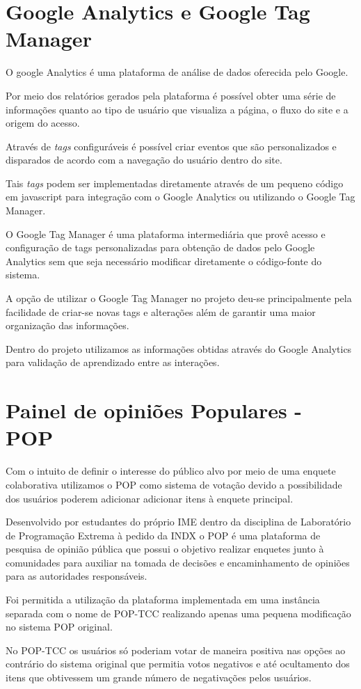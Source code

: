 \section{Google Analytics e Google Tag Manager}
\par O google Analytics é uma plataforma de análise de dados oferecida pelo Google.
\par Por meio dos relatórios gerados pela plataforma é possível obter uma série de informações quanto ao tipo de usuário que visualiza a página, o fluxo do site e a origem do acesso.
\par Através de \emph{tags} configuráveis é possível criar eventos que são personalizados e disparados de acordo com a navegação do usuário dentro do site.
\par Tais \emph{tags} podem ser implementadas diretamente através de um pequeno código em javascript para integração com o Google Analytics ou utilizando o Google Tag Manager.
\par O Google Tag Manager é uma plataforma intermediária que provê acesso e configuração de tags personalizadas para obtenção de dados pelo Google Analytics sem que seja necessário modificar diretamente o código-fonte do sistema.
\par A opção de utilizar o Google Tag Manager no projeto deu-se principalmente pela facilidade de criar-se novas tags e alterações além de garantir uma maior organização das informações.
\par Dentro do projeto utilizamos as informações obtidas através do Google Analytics para validação de aprendizado entre as interações.

\section{Painel de opiniões Populares - POP}
\par Com o intuito de definir o interesse do público alvo por meio de uma enquete colaborativa utilizamos o POP como sistema de votação devido a possibilidade dos usuários poderem adicionar adicionar itens à enquete principal.
\par Desenvolvido por estudantes do próprio IME dentro da disciplina de Laboratório de Programação Extrema à pedido da INDX o POP é uma plataforma de pesquisa de opinião pública que possui o objetivo realizar enquetes junto à comunidades para auxiliar na tomada de decisões e encaminhamento de opiniões para as autoridades responsáveis.
\par Foi permitida a utilização da plataforma implementada em uma instância separada com o nome de POP-TCC realizando apenas uma pequena modificação no sistema POP original.
\par No POP-TCC os usuários só poderiam votar de maneira positiva nas opções ao contrário do sistema original que permitia votos negativos e até ocultamento dos itens que obtivessem um grande número de negativações pelos usuários.

